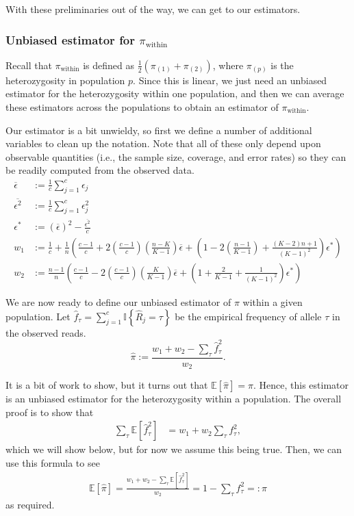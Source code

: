 \documentclass[letterpaper,fontsize=9pt,DIV=12]{scrartcl}
\newcommand*{\piw}{$\pi_\text{within}$\xspace}
\begin{document}
With these preliminaries out of the way, we can get to our estimators.


\subsubsection*{Unbiased estimator for \piw}
\label{supp:sec:FST:sub:HeterozygositySequencingError:sub:UnbiasedPIW}

Recall that \piw is defined as $\frac{1}{2}\left(\pi_{(1)} + \pi_{(2)}\right)$, where $\pi_{(p)}$ is the heterozygosity in population $p$.  Since this is linear, we just need an unbiased estimator for the heterozygosity within one population, and then we can average these estimators across the populations to obtain an estimator of \piw.

Our estimator is a bit unwieldy, so first we define a number of additional variables to clean up the notation.  Note that all of these only depend upon observable quantities (i.e., the sample size, coverage, and error rates) so they can be readily computed from the observed data.
\begin{align*}
\overline{\epsilon} &:= \frac{1}{c} \sum_{j=1}^c \epsilon_j\\
\overline{\epsilon^2} &:= \frac{1}{c} \sum_{j=1}^c \epsilon_j^2\\
\epsilon^* &:= (\overline{\epsilon})^2 - \frac{\overline{\epsilon^2}}{c}\\
w_1 &:= \frac{1}{c} + \frac{1}{n}\left(\frac{c-1}{c} + 2\left(\frac{c-1}{c}\right)\left(\frac{n-K}{K-1}\right)\overline{\epsilon} + \left(1 - 2\left(\frac{n-1}{K-1}\right) + \frac{(K-2)n + 1}{(K-1)^2}\right)\epsilon^*\right)\\
w_2 &:= \frac{n-1}{n}\left(\frac{c-1}{c} - 2\left(\frac{c-1}{c}\right)\left(\frac{K}{K-1}\right)\overline{\epsilon} + \left(1 + \frac{2}{K-1} + \frac{1}{(K-1)^2}\right)\epsilon^*\right)
\end{align*}

We are now ready to define our unbiased estimator of $\pi$ within a given population.  Let $\hat{f}_\tau = \sum_{j=1}^c \mathbb{I}\left\{\hat{R}_j = \tau\right\}$ be the empirical frequency of allele $\tau$ in the observed reads.
\[
\widehat{\pi} := \frac{w_1 + w_2 - \sum_\tau \hat{f}_\tau^2}{w_2}.
\]

It is a bit of work to show, but it turns out that $\mathbb{E}[\widehat{\pi}] = \pi$. Hence, this estimator is an unbiased estimator for the heterozygosity within a population.  The overall proof is to show that
\begin{align}
\sum_\tau\mathbb{E}\left[\hat{f}_\tau^2\right] &= w_1 + w_2 \sum_\tau f_\tau^2, \label{eq:lemma}
\end{align}
which we will show below, but for now we assume this being true.  Then, we can use this formula to see
\begin{align*}
\mathbb{E}\left[\widehat{\pi}\right] = \frac{w_1 + w_2 - \sum_\tau \mathbb{E}\left[\hat{f}_\tau^2\right]}{w_2} = 1 -\sum_\tau f_\tau^2 =: \pi
\end{align*}
as required.
\end{document}
